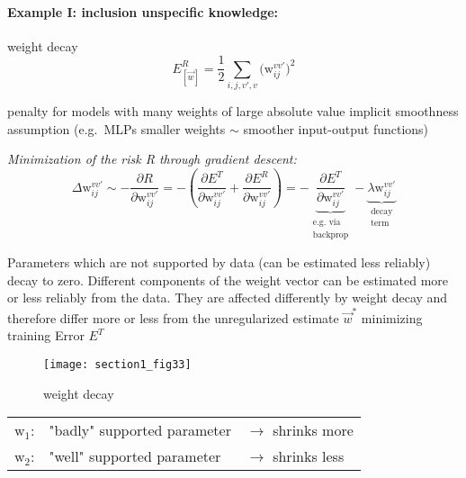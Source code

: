 \paragraph{Example I: inclusion unspecific knowledge:} weight decay
\begin{equation}
	E_{[\vec{w}]}^R = \frac{1}{2} \sum_{i, j, v', v} 
		\big( \mathrm{w}_{ij}^{vv'} \big)^2
\end{equation}
\begin{itemize}
  \itr penalty for models with many weights of large absolute value
  \itr implicit smoothness assumption (e.g.\ MLPs smaller weights
  $\sim$ smoother input-output functions)
\end{itemize}
\emph{Minimization of the risk R through gradient descent:}
\begin{equation}
	\Delta \mathrm{w}_{ij}^{vv'} \sim 
		-\frac{\partial R}{\partial \mathrm{w}_{ij}^{vv'}}
= -\left(\frac{\partial E^T}{\partial \mathrm{w}_{ij}^{vv'}}
  +\frac{\partial E^R}{\partial \mathrm{w}_{ij}^{vv'}}\right) 
= -\underbrace{\frac{\partial E^T}{\partial \mathrm{w}_{ij}^{vv'}}}_{
		\substack{\text{e.g. via} \\ \text{backprop}}}
	- \underbrace{\lambda \mathrm{w}_{ij}^{vv'}}_{
		\substack{\text{decay} \\ \text{term}}}
\end{equation}
\begin{itemize}
  \itl Parameters which are not supported by data (can be estimated
  less reliably) decay to zero.
  \itl Different components of the weight vector can be estimated more or less reliably from the data. They are affected differently by weight decay and therefore differ more or less from the unregularized estimate $\vec{w}^*$ minimizing training Error $E^T$
\end{itemize}

\begin{figure}[h]
  \centering
\texttt{[image: section1\_fig33]}  
  \caption{weight decay}
  \label{fig:weight-shrinkage}
\end{figure}


\begin{tabular}{l l l }
$\mathrm{w}_1$: & "badly" supported parameter& $\rightarrow$ shrinks more\\
$\mathrm{w}_2$: & "well" supported parameter & $\rightarrow$ shrinks less
\end{tabular}
